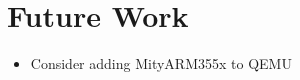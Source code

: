 \section{Future Work}\label{sec:future_work}
\begin{itemize}
  \item Consider adding MityARM355x to QEMU
\end{itemize}
